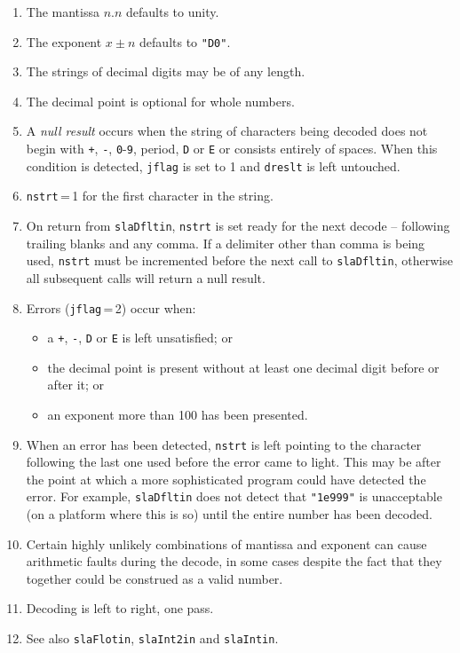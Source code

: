 \documentclass[11pt,fleqn,twoside]{article}
\renewcommand{\_}{{\tt\char'137}}     %
\newcommand{\cstring}[1]{\mbox{{\tt "#1"}}}
\begin{document}
{\begin{enumerate}
 \item The mantissa $n.n$ defaults to unity.
 \item The exponent $x\!\pm\!n$ defaults to \cstring{D0}.
 \item The strings of decimal digits may be of any length.
 \item The decimal point is optional for whole numbers.
 \item A {\it null result}\/ occurs when the string of characters
       being decoded does not begin with
             {\tt +},
             {\tt -},
             {\tt 0}-{\tt 9},
             period,
             {\tt D} or
             {\tt E}
       or consists entirely of spaces.  When this condition is
       detected, {\tt jflag} is set to 1 and
       {\tt dreslt} is left untouched.
 \item {\tt nstrt}\,=\,1 for the first character in the string.
 \item On return from {\tt slaDfltin}, {\tt nstrt} is set ready for the next
       decode -- following trailing blanks and any comma.  If a
       delimiter other than comma is being used, {\tt nstrt} must be
       incremented before the next call to {\tt slaDfltin}, otherwise
       all subsequent calls will return a null result.
 \item Errors ({\tt jflag}\,=\,2) occur when:
       \begin{itemize}
       \item a
             {\tt +},
             {\tt -},
             {\tt D} or
             {\tt E}
       is left unsatisfied; or
       \item the decimal point is present without at least
             one decimal digit before or after it; or
       \item an exponent more than 100 has been presented.
       \end{itemize}
 \item When an error has been detected, {\tt nstrt} is left
       pointing to the character following the last
       one used before the error came to light.  This
       may be after the point at which a more sophisticated
       program could have detected the error.  For example,
       {\tt slaDfltin} does not detect that \cstring{1e999} is unacceptable
       (on a platform where this is so) until the entire number
       has been decoded.
 \item Certain highly unlikely combinations of mantissa and
       exponent can cause arithmetic faults during the
       decode, in some cases despite the fact that they
       together could be construed as a valid number.
 \item Decoding is left to right, one pass.
 \item See also {\tt slaFlotin}, {\tt slaInt2in} and {\tt slaIntin}.
 \end{enumerate}
}
\end{document}
